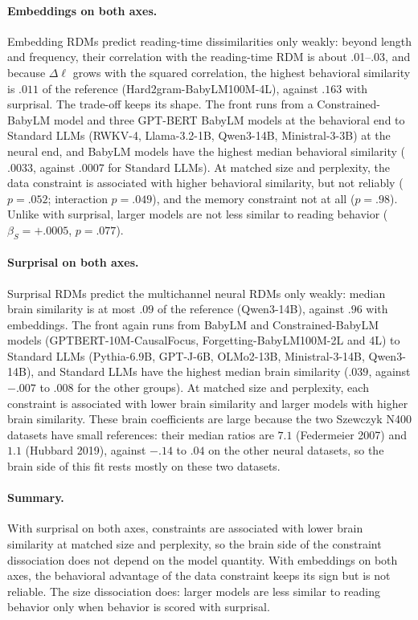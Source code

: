 \paragraph{Embeddings on both axes.} Embedding RDMs predict reading-time dissimilarities only weakly: beyond length and frequency, their correlation with the reading-time RDM is about .01--.03, and because $\Delta\ell$ grows with the squared correlation, the highest behavioral similarity is $.011$ of the reference (Hard2gram-BabyLM100M-4L), against $.163$ with surprisal. The trade-off keeps its shape. The front runs from a Constrained-BabyLM model and three GPT-BERT BabyLM models at the behavioral end to Standard LLMs (RWKV-4, Llama-3.2-1B, Qwen3-14B, Ministral-3-3B) at the neural end, and BabyLM models have the highest median behavioral similarity ($.0033$, against $.0007$ for Standard LLMs). At matched size and perplexity, the data constraint is associated with higher behavioral similarity, but not reliably ($p=.052$; interaction $p=.049$), and the memory constraint not at all ($p=.98$). Unlike with surprisal, larger models are not less similar to reading behavior ($\beta_S=+.0005$, $p=.077$).

\paragraph{Surprisal on both axes.} Surprisal RDMs predict the multichannel neural RDMs only weakly: median brain similarity is at most $.09$ of the reference (Qwen3-14B), against $.96$ with embeddings. The front again runs from BabyLM and Constrained-BabyLM models (GPTBERT-10M-CausalFocus, Forgetting-BabyLM100M-2L and 4L) to Standard LLMs (Pythia-6.9B, GPT-J-6B, OLMo2-13B, Ministral-3-14B, Qwen3-14B), and Standard LLMs have the highest median brain similarity ($.039$, against $-.007$ to $.008$ for the other groups). At matched size and perplexity, each constraint is associated with lower brain similarity and larger models with higher brain similarity. These brain coefficients are large because the two Szewczyk N400 datasets have small references: their median ratios are $7.1$ (Federmeier 2007) and $1.1$ (Hubbard 2019), against $-.14$ to $.04$ on the other neural datasets, so the brain side of this fit rests mostly on these two datasets.

\paragraph{Summary.} With surprisal on both axes, constraints are associated with lower brain similarity at matched size and perplexity, so the brain side of the constraint dissociation does not depend on the model quantity. With embeddings on both axes, the behavioral advantage of the data constraint keeps its sign but is not reliable. The size dissociation does: larger models are less similar to reading behavior only when behavior is scored with surprisal.
